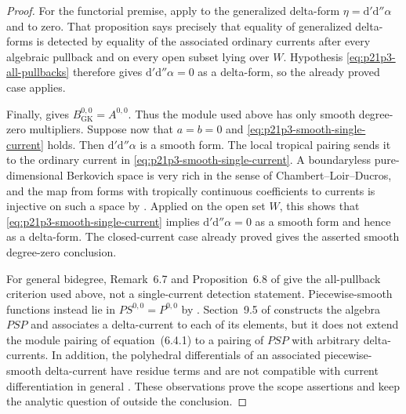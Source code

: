 \begin{proof}
For the functorial premise, apply
\cite[Proposition~6.8]{GK17} to the generalized delta-form
\(\eta=\mathrm d'\mathrm d''\alpha\) and to zero.  That proposition says
precisely that equality of generalized delta-forms is detected by equality
of the associated ordinary currents after every algebraic pullback and on
every open subset lying over \(W\).  Hypothesis
\eqref{eq:p21p3-all-pullbacks} therefore gives
\(\mathrm d'\mathrm d''\alpha=0\) as a delta-form, so the already proved
case applies.

Finally, \cite[equation~(4.19.1)]{GK17} gives
\(B_{\mathrm{GK}}^{0,0}=A^{0,0}\).  Thus the module used above has only
smooth degree-zero multipliers.  Suppose now that \(a=b=0\) and
\eqref{eq:p21p3-smooth-single-current} holds.  Then
\(\mathrm d'\mathrm d''\alpha\) is a smooth form.  The local tropical
pairing sends it to the ordinary current in
\eqref{eq:p21p3-smooth-single-current}.  A boundaryless pure-dimensional
Berkovich space is very rich in the sense of Chambert--Loir--Ducros, and
the map from forms with tropically continuous coefficients to currents is
injective on such a space by \cite[Corollary~7.3.9]{CLD25}.  Applied on
the open set \(W\), this shows that
\eqref{eq:p21p3-smooth-single-current} implies
\(\mathrm d'\mathrm d''\alpha=0\) as a smooth form and hence as a
delta-form.  The closed-current case already proved gives the asserted
smooth degree-zero conclusion.

For general bidegree, Remark~6.7 and Proposition~6.8 of \cite{GK17} give
the all-pullback criterion used above, not a single-current detection
statement.  Piecewise-smooth functions instead lie in
\(P\!S^{0,0}=P^{0,0}\) by \cite[equation~(9.3.1)]{GK17}.  Section~9.5 of
\cite{GK17} constructs the algebra \(P\!S\!P\) and associates a
delta-current to each of its elements, but it does not extend the module
pairing of equation~(6.4.1) to a pairing of \(P\!S\!P\) with arbitrary
delta-currents.  In addition, the polyhedral differentials of an associated
piecewise-smooth delta-current have residue terms and are not compatible
with current differentiation in general \cite[Remark~9.6]{GK17}.  These
observations prove the scope assertions and keep the analytic question of
\cite[\S8.6.1]{CLD25} outside the conclusion.
\end{proof}
